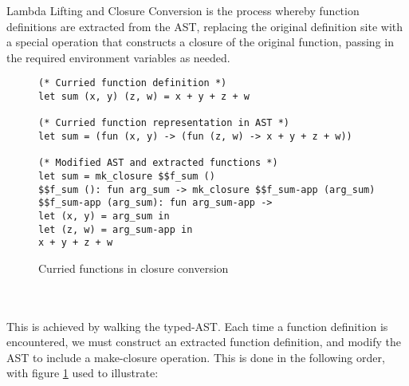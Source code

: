 \documentclass[12pt,twoside,notitlepage]{report}
\begin{document}
Lambda Lifting and Closure Conversion is the process whereby function definitions are extracted from the AST, replacing the original definition site with a special operation that constructs a closure of the original function, passing in the required environment variables as needed.
\begin{figure}[h]
	\begin{verbatim}
(* Curried function definition *)
let sum (x, y) (z, w) = x + y + z + w

(* Curried function representation in AST *)
let sum = (fun (x, y) -> (fun (z, w) -> x + y + z + w))

(* Modified AST and extracted functions *)
let sum = mk_closure $$f_sum ()
$$f_sum (): fun arg_sum -> mk_closure $$f_sum-app (arg_sum)
$$f_sum-app (arg_sum): fun arg_sum-app ->
let (x, y) = arg_sum in
let (z, w) = arg_sum-app in
x + y + z + w
	\end{verbatim}
	\caption{Curried functions in closure conversion}
	\label{fig:curried}
\end{figure}
\\\\
This is achieved by walking the typed-AST. Each time a function definition is encountered, we must construct an extracted function definition, and modify the AST to include a make-closure operation. This is done in the following order, with figure \ref{fig:curried} used to illustrate:
\end{document}
